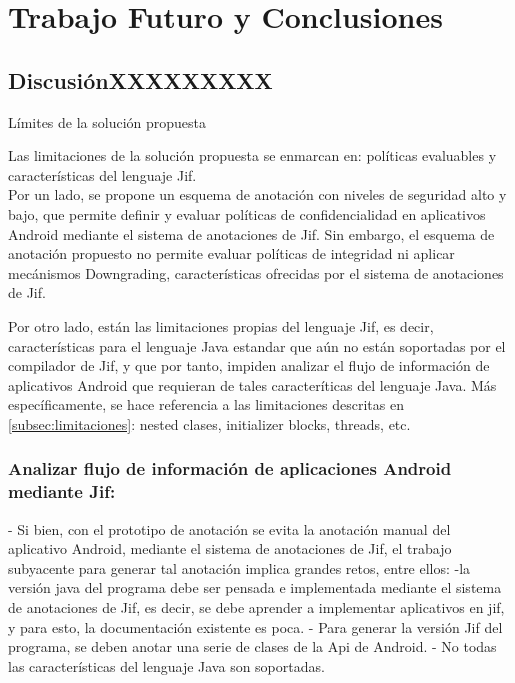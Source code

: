 \label{ch:trabajoFuturo}
\chapter{Trabajo Futuro y Conclusiones}
\section{DiscusiónXXXXXXXXX}
Límites de la solución propuesta\newline

Las limitaciones de la solución propuesta se enmarcan en: políticas evaluables y
características del lenguaje Jif.\\
Por un lado, se propone un esquema de anotación con niveles de seguridad alto y
bajo, que permite definir y evaluar políticas de confidencialidad en aplicativos
Android mediante el sistema de anotaciones de Jif.
Sin embargo, el esquema de anotación propuesto no permite evaluar políticas de
integridad ni aplicar mecánismos Downgrading, características ofrecidas por el
sistema de anotaciones de Jif.

Por otro lado, están las limitaciones propias del lenguaje Jif, es decir,
características para el lenguaje Java estandar que aún no están soportadas por
el compilador de Jif, y que por tanto, impiden analizar el flujo de información
de aplicativos Android que requieran de tales caracteríticas del lenguaje Java.
Más específicamente, se hace referencia a las limitaciones descritas en
\ref{subsec:limitaciones}: nested clases, initializer blocks, threads, etc.

\subsection{Analizar flujo de información de aplicaciones Android mediante Jif:}
- Si bien, con el prototipo de anotación se evita la anotación manual del
aplicativo Android, mediante el sistema de anotaciones de Jif, el trabajo
subyacente para generar tal anotación implica grandes retos, entre ellos:\newline
-la versión java del programa debe ser pensada e implementada mediante el
sistema de anotaciones de Jif, es decir, se debe aprender a implementar
aplicativos en jif, y para esto, la documentación existente es poca.\newline
- Para generar la versión Jif del programa, se deben anotar una serie de clases
de la Api de Android.\newline
- No todas las características del lenguaje Java son soportadas.

